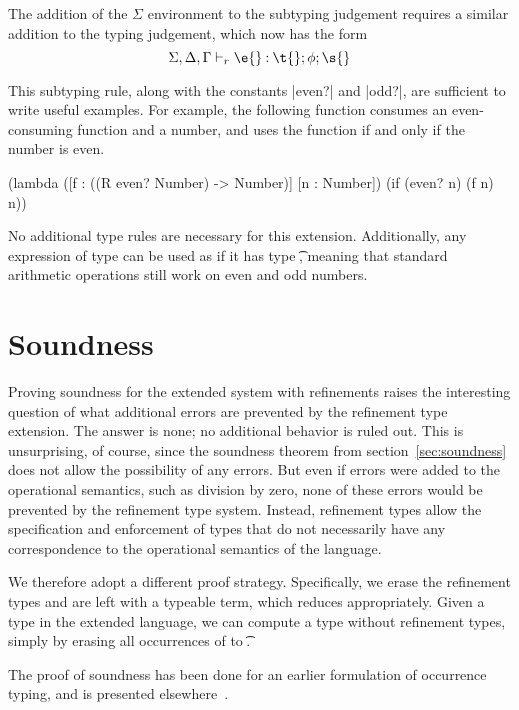 \begin{schemeregion}
The addition of the $\Sigma$ environment to the subtyping judgement requires a
similar addition to the typing judgement, which now has the form
\[
\dghastyeff{\e{}}{\t{}}{\phi{};\s{}}
\]

This subtyping rule, along with the constants \scheme|even?| and
\scheme|odd?|, are sufficient to write useful examples.  For
example, the following function consumes an even-consuming function and a
number, and uses the function if and only if the number is even.

\begin{exmp}
\begin{schemedisplay}
(lambda ([f : ((R even? Number) -> Number)] [n : Number])
  (if (even? n) (f n) n))
\end{schemedisplay}
\end{exmp}

No additional type rules are necessary for this extension.
Additionally, any expression of type \rct can be used as if it has
type \t{}, meaning that standard arithmetic operations still work on
even and odd numbers.  

\section{Soundness}

Proving soundness for the extended system with refinements raises the
interesting question of what additional errors are prevented by the
refinement type extension.  The answer is none; no additional
behavior is ruled out.  This is unsurprising, of course, since the
soundness theorem from section~\ref{sec:soundness} does not allow the
possibility of any errors.  But even if errors were added to the
operational semantics, such as division by zero, none of these errors
would be prevented by the refinement type system.  Instead, refinement
types allow the specification and enforcement of types that
 do not necessarily have any correspondence to the operational
semantics of the language.  

 We therefore adopt a different proof strategy.  Specifically, we erase
 the refinement types 
 and are left with a typeable term, which reduces appropriately. 
   Given a type in the extended
 language, we can compute a type without refinement types, simply by
 erasing all occurrences of \RR{\cc{}}{\t{}} to \t{}.  

The proof of soundness has been done for an earlier formulation of
occurrence typing, and is presented elsewhere~\cite{mitchfest-submitted}.



\end{schemeregion}
